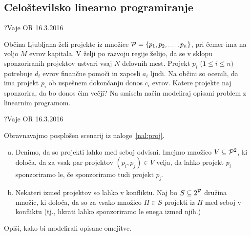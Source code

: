 \subsection{Celoštevilsko linearno programiranje}

\begin{naloga}{?}{Vaje OR 16.3.2016}
\begin{vprasanje}
Občina Ljubljana želi projekte iz množice
$\mathcal{P} = \{p_1, p_2, \dots, p_n\}$,
pri čemer ima na voljo $M$ evrov kapitala.
V želji po razvoju regije želijo,
da se v sklopu sponzoriranih projektov ustvari vsaj $N$ delovnih mest.
Projekt $p_i$ ($1 \le i \le n)$ potrebuje $d_i$ evrov finančne pomoči
in zaposli $a_i$ ljudi.
Na občini so ocenili,
da ima projekt $p_i$ ob uspešnem dokončanju donos $c_i$ evrov.
Katere projekte naj sponzorira, da bo donos čim večji?
Na smiseln način modeliraj opisani problem z linearnim programom.
\end{vprasanje}
\begin{odgovor}
\end{odgovor}
\end{naloga}


\begin{naloga}{?}{Vaje OR 16.3.2016}
\begin{vprasanje}
Obravnavajmo posplošen scenarij iz naloge~\ref{nal:proj}.
\begin{enumerate}[(a)]
\item Denimo, da so projekti lahko med seboj odvisni.
Imejmo množico $V \subseteq \mathcal{P}^2$, ki določa,
da za vsak par projektov $(p_i, p_j) \in V$ velja,
da lahko projekt $p_i$ sponzoriramo le,
če sponzoriramo tudi projekt $p_j$.

\item Nekateri izmed projektov so lahko v konfliktu.
Naj bo $S \subseteq 2^{\mathcal{P}}$ družina množic, ki določa,
da so za vsako množico $H \in S$ projekti iz $H$ med seboj v konfliktu
(tj., hkrati lahko sponzoriramo le enega izmed njih.)
\end{enumerate}
Opiši, kako bi modelirali opisane omejitve.
\end{vprasanje}
\begin{odgovor}
\end{odgovor}
\end{naloga}


